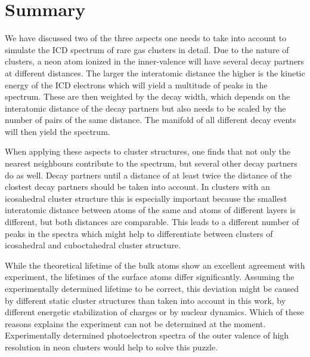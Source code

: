 \section{Summary}
\label{sec:summary}

We have discussed two of the three aspects one needs to take into account
to simulate the ICD spectrum of rare gas clusters in detail. Due to the nature
of clusters, a neon atom ionized in the inner-valence will have several decay
partners at different distances. The larger the interatomic distance the higher
is the kinetic energy of the ICD electrons which will yield a multitude of
peaks in the spectrum. These are then weighted by the decay width, which
depends on the interatomic distance of the decay partners but also needs
to be scaled by the number of pairs of the same distance.
The manifold of all different decay events will then yield the spectrum.

When applying these aspects to cluster structures, one finds that not only
the nearest neighbours contribute to the spectrum, but several other decay
partners do as well. Decay partners until a distance of at least twice the
distance of the clostest decay partners should be taken into account.
In clusters with an icosahedral cluster structure this is especially important
because the smallest interatomic distance between atoms of the same and atoms
of different layers is different, but both distances are comparable.
This leads to a different number of peaks in the spectra which might help to
differentiate between clusters of icosahedral and cuboctahedral cluster structure.

While the theoretical lifetime of the bulk atoms show an excellent agreement
with experiment, the lifetimes of the surface atoms differ significantly.
Assuming the experimentally determined lifetime to be correct, this deviation
might be caused by different static cluster structures than taken into account
in this work, by different energetic stabilization of charges or by nuclear
dynamics. Which of these reasons explains the experiment can not be determined
at the moment. Experimentally determined photoelectron spectra of the outer
valence of high resolution in neon clusters would help to solve this puzzle.
